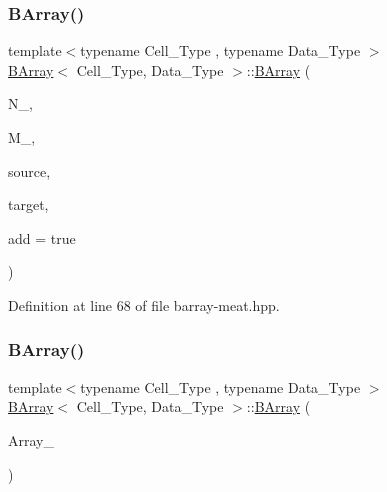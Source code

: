 \subsubsection{\texorpdfstring{B\+Array()}{BArray()}\hspace{0.1cm}{\footnotesize\ttfamily [4/5]}}
{\footnotesize\ttfamily template$<$typename Cell\+\_\+\+Type , typename Data\+\_\+\+Type $>$ \\
\hyperlink{class_b_array}{B\+Array}$<$ Cell\+\_\+\+Type, Data\+\_\+\+Type $>$\+::\hyperlink{class_b_array}{B\+Array} (\begin{DoxyParamCaption}\item[{\hyperlink{typedefs_8hpp_a91ad9478d81a7aaf2593e8d9c3d06a14}{uint}}]{N\+\_\+,  }\item[{\hyperlink{typedefs_8hpp_a91ad9478d81a7aaf2593e8d9c3d06a14}{uint}}]{M\+\_\+,  }\item[{const std\+::vector$<$ \hyperlink{typedefs_8hpp_a91ad9478d81a7aaf2593e8d9c3d06a14}{uint} $>$ \&}]{source,  }\item[{const std\+::vector$<$ \hyperlink{typedefs_8hpp_a91ad9478d81a7aaf2593e8d9c3d06a14}{uint} $>$ \&}]{target,  }\item[{bool}]{add = {\ttfamily true} }\end{DoxyParamCaption})\hspace{0.3cm}{\ttfamily [inline]}}



Definition at line 68 of file barray-\/meat.\+hpp.

\mbox{\label{class_b_array_ac003699092c4f91c5b292320ca769f85}} 
\subsubsection{\texorpdfstring{B\+Array()}{BArray()}\hspace{0.1cm}{\footnotesize\ttfamily [5/5]}}
{\footnotesize\ttfamily template$<$typename Cell\+\_\+\+Type , typename Data\+\_\+\+Type $>$ \\
\hyperlink{class_b_array}{B\+Array}$<$ Cell\+\_\+\+Type, Data\+\_\+\+Type $>$\+::\hyperlink{class_b_array}{B\+Array} (\begin{DoxyParamCaption}\item[{const \hyperlink{class_b_array}{B\+Array}$<$ Cell\+\_\+\+Type, Data\+\_\+\+Type $>$ \&}]{Array\+\_\+ }\end{DoxyParamCaption})\hspace{0.3cm}{\ttfamily [inline]}}



